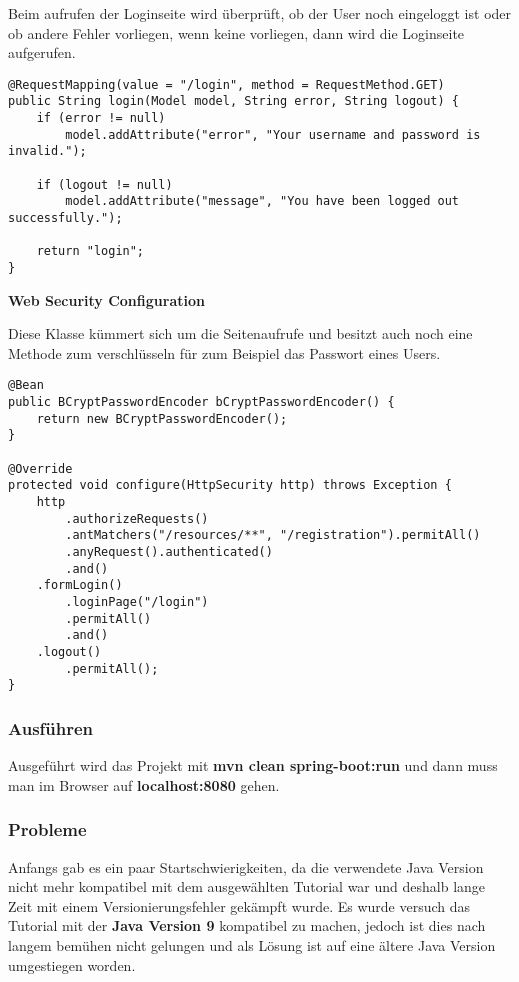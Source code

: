 Beim aufrufen der Loginseite wird überprüft, ob der User noch eingeloggt ist oder ob andere Fehler vorliegen, wenn keine vorliegen, dann wird die Loginseite aufgerufen.

\begin{lstlisting}[style=Java]
@RequestMapping(value = "/login", method = RequestMethod.GET)
public String login(Model model, String error, String logout) {
	if (error != null)
		model.addAttribute("error", "Your username and password is invalid.");

	if (logout != null)
		model.addAttribute("message", "You have been logged out successfully.");
		
	return "login";
}
\end{lstlisting}

\item \textbf{Web Security Configuration}

Diese Klasse kümmert sich um die Seitenaufrufe und besitzt auch noch eine Methode zum verschlüsseln für zum Beispiel das Passwort eines Users.

\begin{lstlisting}[style=Java]
@Bean
public BCryptPasswordEncoder bCryptPasswordEncoder() {
	return new BCryptPasswordEncoder();
}

@Override
protected void configure(HttpSecurity http) throws Exception {
	http
		.authorizeRequests()
		.antMatchers("/resources/**", "/registration").permitAll()
		.anyRequest().authenticated()
		.and()
	.formLogin()
		.loginPage("/login")
		.permitAll()
		.and()
	.logout()
		.permitAll();
}
\end{lstlisting}

\clearpage

\subsubsection{Ausführen}

Ausgeführt wird das Projekt mit \textbf{mvn clean spring-boot:run} und dann muss man im Browser auf \textbf{localhost:8080} gehen.


\subsubsection{Probleme}
Anfangs gab es ein paar \glqq Startschwierigkeiten\grqq , da die verwendete Java Version nicht mehr kompatibel mit dem ausgewählten Tutorial war und deshalb lange Zeit mit einem Versionierungsfehler gekämpft wurde. Es wurde versuch das Tutorial mit der \textbf{Java Version 9} kompatibel zu machen, jedoch ist dies nach langem bemühen nicht gelungen und als Lösung ist auf eine ältere Java Version umgestiegen worden.

